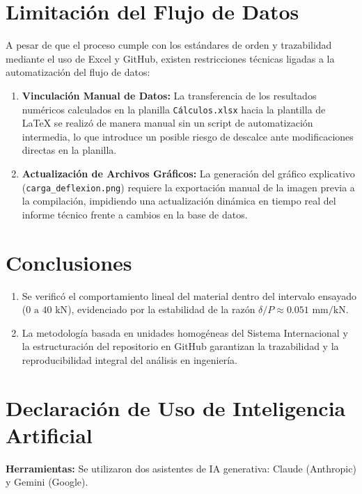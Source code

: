 \documentclass[10pt,letterpaper]{article}
\begin{document}
\section{Limitación del Flujo de Datos}

A pesar de que el proceso cumple con los estándares de orden y trazabilidad mediante el uso de Excel y GitHub, existen restricciones técnicas ligadas a la automatización del flujo de datos:

\begin{enumerate}
    \item \textbf{Vinculación Manual de Datos:} La transferencia de los resultados numéricos calculados en la planilla \texttt{Cálculos.xlsx} hacia la plantilla de \LaTeX{} se realizó de manera manual sin un script de automatización intermedia, lo que introduce un posible riesgo de descalce ante modificaciones directas en la planilla.
    \item \textbf{Actualización de Archivos Gráficos:} La generación del gráfico explicativo (\texttt{carga\_deflexion.png}) requiere la exportación manual de la imagen previa a la compilación, impidiendo una actualización dinámica en tiempo real del informe técnico frente a cambios en la base de datos.
\end{enumerate}

\section{Conclusiones}

\begin{enumerate}
    \item Se verificó el comportamiento lineal del material dentro del intervalo ensayado ($0\text{ a }40\text{ kN}$), evidenciado por la estabilidad de la razón $\delta/P \approx 0.051\text{ mm/kN}$.
    \item La metodología basada en unidades homogéneas del Sistema Internacional y la estructuración del repositorio en GitHub garantizan la trazabilidad y la reproducibilidad integral del análisis en ingeniería.
\end{enumerate}

\section*{Declaración de Uso de Inteligencia Artificial}

\textbf{Herramientas:} Se utilizaron dos asistentes de IA generativa: Claude (Anthropic) y Gemini (Google).
\end{document}
